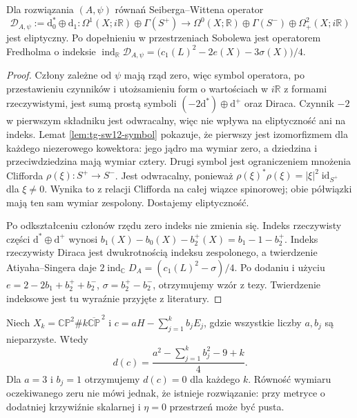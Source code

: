 \begin{twierdzenie}
\label{thm:tg-sw12-fredholm}
Dla rozwiązania $(A,\psi)$ równań Seiberga--Wittena operator
\[
\mathcal D_{A,\psi}:=\mathrm d_0^*\oplus\mathrm d_1:
\Omega^1(X;i\mathbb R)\oplus\Gamma(S^+)
\longrightarrow
\Omega^0(X;\mathbb R)\oplus\Gamma(S^-)
\oplus\Omega^2_+(X;i\mathbb R)
\]
jest eliptyczny. Po dopełnieniu w przestrzeniach Sobolewa
jest operatorem Fredholma o indeksie
$\operatorname{ind}_\mathbb R\mathcal D_{A,\psi}
=\bigl(c_1(L)^2-2e(X)-3\sigma(X)\bigr)/4$.
\end{twierdzenie}

\begin{proof}
Człony zależne od $\psi$ mają rząd zero, więc symbol
operatora, po przestawieniu czynników i
utożsamieniu form o wartościach w $i\mathbb R$
z formami rzeczywistymi, jest sumą prostą
symboli $(-2\mathrm d^*)\oplus\mathrm d^+$
oraz Diraca. Czynnik $-2$ w pierwszym
składniku jest odwracalny, więc nie wpływa
na eliptyczność ani na indeks.
Lemat \ref{lem:tg-sw12-symbol} pokazuje, że pierwszy jest
izomorfizmem dla każdego niezerowego kowektora: jego jądro
ma wymiar zero, a dziedzina i przeciwdziedzina mają
wymiar cztery. Drugi symbol jest ograniczeniem mnożenia Clifforda
$\rho(\xi)\colon S^+\to S^-$. Jest odwracalny,
ponieważ $\rho(\xi)^*\rho(\xi)=
|\xi|^2\operatorname{id}_{S^+}$ dla $\xi\ne0$.
Wynika to z relacji Clifforda na całej wiązce spinorowej;
obie półwiązki mają ten sam wymiar zespolony.
Dostajemy eliptyczność.

Po odkształceniu członów rzędu zero indeks nie zmienia
się. Indeks rzeczywisty części $\mathrm d^*\oplus\mathrm d^+$
wynosi $b_1(X)-b_0(X)-b_2^+(X)=b_1-1-b_2^+$.
Indeks rzeczywisty Diraca jest dwukrotnością indeksu
zespolonego, a twierdzenie Atiyaha--Singera daje
$2\operatorname{ind}_\mathbb C D_A=(c_1(L)^2-\sigma)/4$.
Po dodaniu i użyciu $e=2-2b_1+b_2^++b_2^-$,
$\sigma=b_2^+-b_2^-$, otrzymujemy wzór z tezy.
Twierdzenie indeksowe jest tu wyraźnie przyjęte z literatury.
\end{proof}

\begin{przyklad}
Niech $X_k=\mathbb{CP}^2\#k\overline{\mathbb{CP}}^{\,2}$
i $c=aH-\sum_{j=1}^k b_jE_j$, gdzie wszystkie liczby
$a,b_j$ są nieparzyste. Wtedy
\[
d(c)=\frac{a^2-\sum_{j=1}^k b_j^2-9+k}{4}.
\]
Dla $a=3$ i $b_j=1$ otrzymujemy $d(c)=0$ dla każdego $k$.
Równość wymiaru oczekiwanego zeru nie mówi jednak,
że istnieje rozwiązanie: przy metryce o dodatniej
krzywiźnie skalarnej i $\eta=0$ przestrzeń może być pusta.
\end{przyklad}

